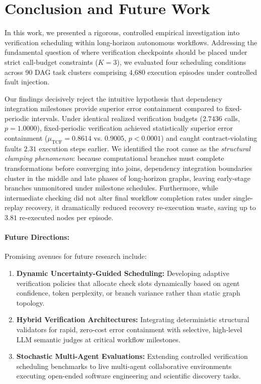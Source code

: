 \section{Conclusion and Future Work}
\label{sec:conclusion}

In this work, we presented a rigorous, controlled empirical investigation into verification scheduling within long-horizon autonomous workflows. Addressing the fundamental question of where verification checkpoints should be placed under strict call-budget constraints ($K = 3$), we evaluated four scheduling conditions across 90 DAG task clusters comprising 4,680 execution episodes under controlled fault injection.

Our findings decisively reject the intuitive hypothesis that dependency integration milestones provide superior error containment compared to fixed-periodic intervals. Under identical realized verification budgets ($2.7436$ calls, $p = 1.0000$), fixed-periodic verification achieved statistically superior error containment ($\mu_{\text{TCF}} = 0.8614$ vs. $0.9005$, $p < 0.0001$) and caught contract-violating faults $2.31$ execution steps earlier. We identified the root cause as the \emph{structural clumping phenomenon}: because computational branches must complete transformations before converging into joins, dependency integration boundaries cluster in the middle and late phases of long-horizon graphs, leaving early-stage branches unmonitored under milestone schedules. Furthermore, while intermediate checking did not alter final workflow completion rates under single-replay recovery, it dramatically reduced recovery re-execution waste, saving up to $3.81$ re-executed nodes per episode.

\paragraph{Future Directions:}
Promising avenues for future research include:
\begin{enumerate}
    \item \textbf{Dynamic Uncertainty-Guided Scheduling:} Developing adaptive verification policies that allocate check slots dynamically based on agent confidence, token perplexity, or branch variance rather than static graph topology.
    \item \textbf{Hybrid Verification Architectures:} Integrating deterministic structural validators for rapid, zero-cost error containment with selective, high-level LLM semantic judges at critical workflow milestones.
    \item \textbf{Stochastic Multi-Agent Evaluations:} Extending controlled verification scheduling benchmarks to live multi-agent collaborative environments executing open-ended software engineering and scientific discovery tasks.
\end{enumerate}
